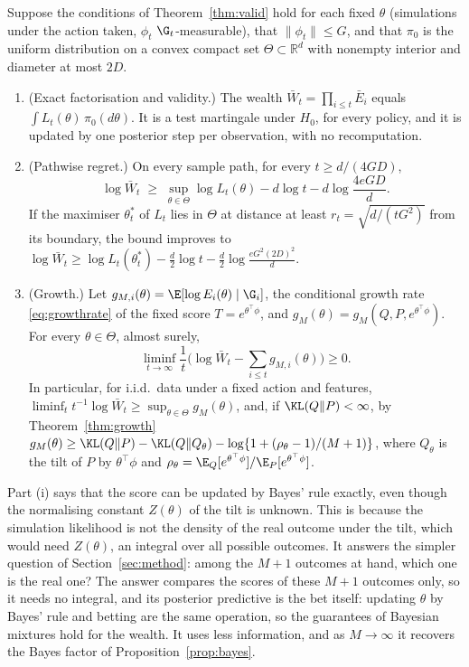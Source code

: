 \begin{theorem}\label{thm:simlik}
Suppose the conditions of Theorem~\ref{thm:valid} hold for each fixed $\theta$
(simulations under the action taken, $\phi_t$ $\G_t$-measurable), that
$\|\phi_t\| \le G$, and that $\pi_0$ is the uniform distribution on a convex
compact set $\Theta \subset \mathbb{R}^d$ with nonempty interior and diameter
at most $2D$.
\begin{enumerate}
  \item[(i)] (Exact factorisation and validity.) The wealth
        $\bar W_t = \prod_{i \le t} \bar E_i$ equals
        $\int L_t(\theta)\,\pi_0(d\theta)$. It is a test martingale under
        $H_0$, for every policy, and it is updated by one posterior step per
        observation, with no recomputation.
  \item[(ii)] (Pathwise regret.) On every sample path, for every
        $t \ge d/(4GD)$,
        \[
        \log \bar W_t \;\ge\; \sup_{\theta \in \Theta} \log L_t(\theta)
        - d \log t - d \log\frac{4eGD}{d}.
        \]
        If the maximiser $\theta^*_t$ of $L_t$ lies in $\Theta$ at distance at
        least $r_t = \sqrt{d/(tG^2)}$ from its boundary, the bound improves to
        $\log \bar W_t \ge \log L_t(\theta_t^*) - \frac d2 \log t
        - \frac d2 \log\frac{e G^2 (2D)^2}{d}$.
  \item[(iii)] (Growth.) Let $g_{M,i}(\theta) = \E[\log E_i(\theta) \mid \G_i]$,
        the conditional growth rate \eqref{eq:growthrate} of the fixed score
        $T = e^{\theta^\top\phi}$, and $g_M(\theta) = g_M(Q, P, e^{\theta^\top\phi})$.
        For every $\theta \in \Theta$, almost surely,
        \[
        \liminf_{t \to \infty} \frac1t \Big(\log \bar W_t - \sum_{i \le t} g_{M,i}(\theta)\Big) \ge 0 .
        \]
        In particular, for i.i.d.\ data under a fixed action and features,
        $\liminf_t t^{-1}\log \bar W_t \ge \sup_{\theta\in\Theta} g_M(\theta)$,
        and, if $\KL(Q\|P) < \infty$, by Theorem~\ref{thm:growth}
        $g_M(\theta) \ge \KL(Q\|P) - \KL(Q\|Q_\theta) - \log\{1 + (\rho_\theta - 1)/(M+1)\}$,
        where $Q_\theta$ is the tilt of $P$ by $\theta^\top\phi$ and
        $\rho_\theta = \E_Q[e^{\theta^\top\phi}]/\E_P[e^{\theta^\top\phi}]$.
\end{enumerate}
\end{theorem}

Part (i) says that the score can be updated by Bayes' rule exactly, even
though the normalising constant $Z(\theta)$ of the tilt is unknown. This is
because the simulation likelihood is not the density of the real outcome under
the tilt, which would need $Z(\theta)$, an integral over all possible
outcomes. It answers the simpler question of Section~\ref{sec:method}: among
the $M+1$ outcomes at hand, which one is the real one? The answer compares the
scores of these $M+1$ outcomes only, so it needs no integral, and its
posterior predictive is the bet itself: updating $\theta$ by Bayes' rule and
betting are the same operation, so the guarantees of Bayesian mixtures hold
for the wealth. It uses less information, and as $M \to \infty$ it recovers
the Bayes factor of Proposition~\ref{prop:bayes}.

